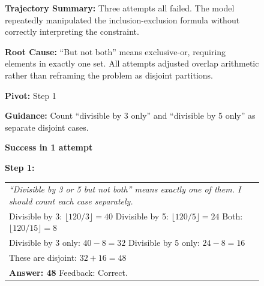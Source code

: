 \begin{figure}[b]
\begin{tcolorbox}
\end{tcolorbox}

\vspace{0.5em}

\begin{tcolorbox}[
    colback=gray!8,
    colframe=black!70,
    title=\textbf{Reflection Output},
    fonttitle=\bfseries\small,
    width=\textwidth,
    boxrule=0.5pt
]
\footnotesize

\textbf{Trajectory Summary:} Three attempts all failed. The model repeatedly manipulated the inclusion-exclusion formula without correctly interpreting the constraint.

\vspace{0.3em}
\textbf{Root Cause:} ``But not both'' means exclusive-or, requiring elements in exactly one set. All attempts adjusted overlap arithmetic rather than reframing the problem as disjoint partitions.

\vspace{0.3em}
\textbf{Pivot:} Step 1

\vspace{0.3em}
\textbf{Guidance:} Count ``divisible by 3 only'' and ``divisible by 5 only'' as separate disjoint cases.

\end{tcolorbox}

\vspace{0.5em}

\begin{tcolorbox}[
    colback=white,
    colframe=black!70,
    title=\textbf{Retry Trajectory (guidance removed for training)},
    fonttitle=\bfseries\small,
    width=\textwidth,
    boxrule=0.5pt
]

\hfill \textcolor{green!50!black}{\textbf{Success in 1 attempt}}

\vspace{0.5em}

\textbf{Step 1:}
\footnotesize
\begin{tabular}{@{}p{14.5cm}@{}}
\textit{``Divisible by 3 or 5 but not both'' means exactly one of them. I should count each case separately.} \\[0.2em]
Divisible by 3: $\lfloor 120/3 \rfloor = 40$ \quad Divisible by 5: $\lfloor 120/5 \rfloor = 24$ \quad Both: $\lfloor 120/15 \rfloor = 8$ \\[0.2em]
Divisible by 3 only: $40 - 8 = 32$ \quad Divisible by 5 only: $24 - 8 = 16$ \\[0.2em]
These are disjoint: $32 + 16 = 48$ \\[0.2em]
\textbf{Answer: 48} \quad \textcolor{green!50!black}{Feedback: Correct.}
\end{tabular}


\end{tcolorbox}
\end{figure}
